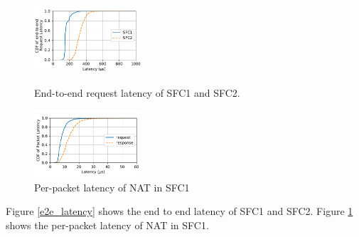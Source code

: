 \begin{figure}
  \begin{minipage}[t]{0.47\columnwidth}
    \centering
    \includegraphics[width=4.0cm]{fig/e2e_latency_chain12.pdf}

    \caption{\small{End-to-end request latency of SFC1 and SFC2.}}
    \label{e2e_latency}
  \end{minipage}%
  \hfill
  \hfill
  \begin{minipage}[t]{0.47\columnwidth}
    \centering
    \includegraphics[width=4.0cm]{fig/cdf_chain1.pdf}
    \caption{\small{Per-packet latency of NAT in SFC1}}
    \label{nat_latency}
  \end{minipage}

\end{figure}

Figure \ref{e2e_latency} shows the end to end latency of SFC1 and SFC2.
Figure \ref{nat_latency} shows the per-packet latency of NAT in SFC1.




